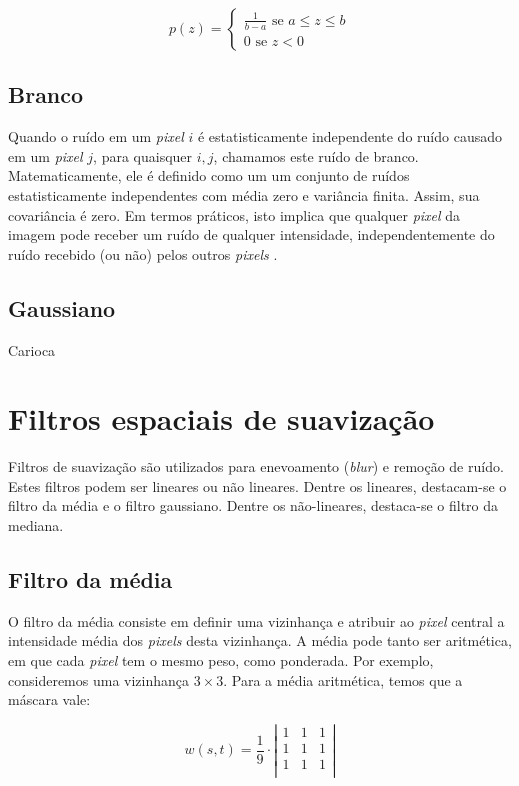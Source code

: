 \documentclass[10pt,a4paper]{article}
\newcommand{\pixel}{\textit{pixel} }
\newcommand{\pixels}{\textit{pixels} }
\begin{document}
\begin{equation}
p(z) = \left\{
    \begin{array}{l}
        \frac{1}{b - a} \text{ se } a \le z \le b \\
        0 \text{ se } z < 0
    \end{array}\right.
\end{equation}

\subsection{Branco}
Quando o ruído em um \pixel $i$ é estatisticamente independente do ruído causado em um \pixel $j$, para quaisquer $i,j$, chamamos este ruído de branco. Matematicamente, ele é definido como um um conjunto de ruídos estatisticamente independentes com média zero e variância finita. Assim, sua covariância é zero. Em termos práticos, isto implica que qualquer \pixel da imagem pode receber um ruído de qualquer intensidade, independentemente do ruído recebido (ou não) pelos outros \pixels.

\subsection{Gaussiano}
Carioca

\section{Filtros espaciais de suavização}
Filtros de suavização são utilizados para enevoamento (\textit{blur}) e remoção de ruído. Estes filtros podem ser lineares ou não lineares. Dentre os lineares, destacam-se o filtro da média e o filtro gaussiano. Dentre os não-lineares, destaca-se o filtro da mediana.

\subsection{Filtro da média}
O filtro da média consiste em definir uma vizinhança e atribuir ao \pixel central a intensidade média dos \pixels desta vizinhança. A média pode tanto ser aritmética, em que cada \pixel tem o mesmo peso, como ponderada. Por exemplo, consideremos uma vizinhança $3\times3$. Para a média aritmética, temos que a máscara vale:

\[ w(s,t) = \frac{1}{9} \cdot \left|
    \begin{array}{ccc}
        1 & 1 & 1 \\
        1 & 1 & 1 \\
        1 & 1 & 1 \\
\end{array}\right|\]
\end{document}
